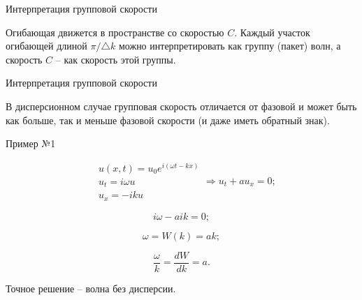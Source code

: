 \documentclass[10pt,xcolor=pst,aspectratio=169]{beamer}
\begin{document}
\begin{frame}{Интерпретация групповой скорости}

    \transdissolve[duration=0.1]
    \justifying
    \large

    \begin{center}
    \end{center}

    Огибающая движется в пространстве со скоростью $C$. Каждый участок огибающей длиной $\pi/\triangle k$ можно интерпретировать как группу (пакет) волн, а скорость $C$ -- как скорость этой группы. \\

\end{frame}

\begin{frame}{Интерпретация групповой скорости}

    \transdissolve[duration=0.1]
    \justifying
    \large

    \begin{center}
    \end{center}

    \begin{center}
    \end{center}

    В дисперсионном случае групповая скорость отличается от фазовой и может быть как больше, так и меньше фазовой скорости (и даже иметь обратный знак).

\end{frame}

\begin{frame}{Пример №1}

    \transdissolve[duration=0.1]
    \justifying
    \large

    \[
        \boxed{
            \begin{split}
                &u \left( x, t \right) = u_{0} e^{i \left( \omega t - k x \right)} \\
                &u_{t} = i \omega u \\
                &u_{x} = - i k u
            \end{split}
        }
        \Rightarrow
        \boxed{
            u_{t} + a u_{x} = 0
        };
    \]

    \[
        i \omega - a i k = 0;
    \]

    \[
        \omega = W \left( k \right) = a k;
    \]

    \[
        \frac{\omega}{k} = \frac{d W}{d k} = a.
    \]

    \begin{center}
        Точное решение -- волна без дисперсии.
    \end{center}

\end{frame}
\end{document}
